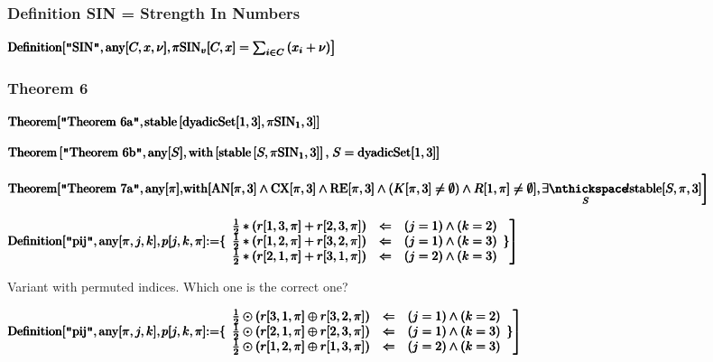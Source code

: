 \documentclass{article}
\begin{document}
\subsubsection*{Definition SIN = Strength In Numbers}

\noindent\(\pmb{\text{Definition}[\text{$\texttt{"}$SIN$\texttt{"}$}, \text{any}[C,x,\nu ],}\\
\pmb{\left.\text{$\pi $SIN}_v[C,x]=\sum _{i\in C} \left(x_i+\nu \right)\right]}\)

\subsubsection*{Theorem 6}

\noindent\(\pmb{\text{Theorem}[\text{$\texttt{"}$Theorem 6a$\texttt{"}$},}\\
\pmb{\left.\text{stable}\left[\text{dyadicSet}[1,3],\text{$\pi $SIN}_1,3\right]\right]}\)

\noindent\(\pmb{\text{Theorem}\left[\text{$\texttt{"}$Theorem 6b$\texttt{"}$}, \text{any}[S],\text{with}\left[\text{stable}\left[S,\text{$\pi $SIN}_1,3\right]\right],\right.}\\
\pmb{S=\text{dyadicSet}[1,3]]}\)

\noindent\(\pmb{\text{Theorem}[\text{$\texttt{"}$Theorem 7a$\texttt{"}$}, \text{any}[\pi ], }\\
\pmb{\text{with}[\text{AN}[\pi ,3]\land \text{CX}[\pi ,3]\land \text{RE}[\pi ,3]\land (K[\pi ,3]\neq \emptyset )\land R[1,\pi ]\neq \emptyset ],}\\
\pmb{\left.\underset{S}{\exists \nthickspace \! !}\text{stable}[S,\pi ,3]\right]}\)

\noindent\(\pmb{\text{Definition}[\text{$\texttt{"}$pij$\texttt{"}$},\text{any}[\pi ,j,k],}\\
\pmb{\left.p[j,k,\pi ]\text{:=}\{
\begin{array}{ccc}
 \frac{1}{2}*(r[1,3,\pi ]+r[2,3,\pi ]) & \Leftarrow  & (j=1)\land (k=2) \\
 \frac{1}{2}*(r[1,2,\pi ]+r[3,2,\pi ]) & \Leftarrow  & (j=1)\land (k=3) \\
 \frac{1}{2}*(r[2,1,\pi ]+r[3,1,\pi ]) & \Leftarrow  & (j=2)\land (k=3)
\end{array}
\} \right]}\)

Variant with permuted indices. Which one is the correct one?

\noindent\(\pmb{\text{Definition}[\text{$\texttt{"}$pij$\texttt{"}$},\text{any}[\pi ,j,k],}\\
\pmb{\left.p[j,k,\pi ]\text{:=}\{
\begin{array}{ccc}
 \frac{1}{2}\odot (r[3,1,\pi ]\oplus r[3,2,\pi ]) & \Leftarrow  & (j=1)\land (k=2) \\
 \frac{1}{2}\odot (r[2,1,\pi ]\oplus r[2,3,\pi ]) & \Leftarrow  & (j=1)\land (k=3) \\
 \frac{1}{2}\odot (r[1,2,\pi ]\oplus r[1,3,\pi ]) & \Leftarrow  & (j=2)\land (k=3)
\end{array}
\} \right]}\)
\end{document}
